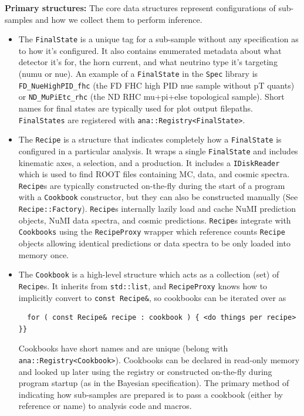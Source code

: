 \documentclass{article}
\begin{document}
\textbf{Primary structures:} The core data structures represent configurations of sub-samples and how we collect them to perform inference.
\begin{itemize}
    \item The \texttt{FinalState} is a unique tag for a sub-sample without any specification as to how it's configured. It also contains enumerated metadata about what detector it's for, the horn current, and what neutrino type it's targeting (numu or nue). An example of a \texttt{FinalState} in the \texttt{Spec} library is \texttt{FD\_NueHighPID\_fhc} (the FD FHC high PID nue sample without pT quants) or \texttt{ND\_MuPiEtc\_rhc} (the ND RHC mu+pi+else topological sample). Short names for final states are typically used for plot output filepaths. \texttt{FinalStates} are registered with \texttt{ana::Registry<FinalState>}.
    \item The \texttt{Recipe} is a structure that indicates completely how a \texttt{FinalState} is configured in a particular analysis. It wraps a single \texttt{FinalState} and includes kinematic axes, a selection, and a production. It includes a \texttt{IDiskReader} which is used to find ROOT files containing MC, data, and cosmic spectra. \texttt{Recipe}s are typically constructed on-the-fly during the start of a program with a \texttt{Cookbook} constructor, but they can also be constructed manually (See \texttt{Recipe::Factory}). \texttt{Recipe}s internally lazily load and cache NuMI prediction objects, NuMI data spectra, and cosmic predictions. \texttt{Recipe}s integrate with \texttt{Cookbooks} using the \texttt{RecipeProxy} wrapper which reference counts \texttt{Recipe} objects allowing identical predictions or data spectra to be only loaded into memory once.
    \item The \texttt{Cookbook} is a high-level structure which acts as a collection (set) of \texttt{Recipe}s. It inherits from \texttt{std::list}, and \texttt{RecipeProxy} knows how to implicitly convert to \texttt{const Recipe\&}, so cookbooks can be iterated over as
\begin{verbatim}
  for ( const Recipe& recipe : cookbook ) { <do things per recipe> }}
\end{verbatim}
      Cookbooks have short names and are unique (belong with \texttt{ana::Registry<Cookbook>}). Cookbooks can be declared in read-only memory and looked up later using the registry or constructed on-the-fly during program startup (as in the Bayesian specification). The primary method of indicating how sub-samples are prepared is to pass a cookbook (either by reference or name) to analysis code and macros.
\end{itemize}
\end{document}
